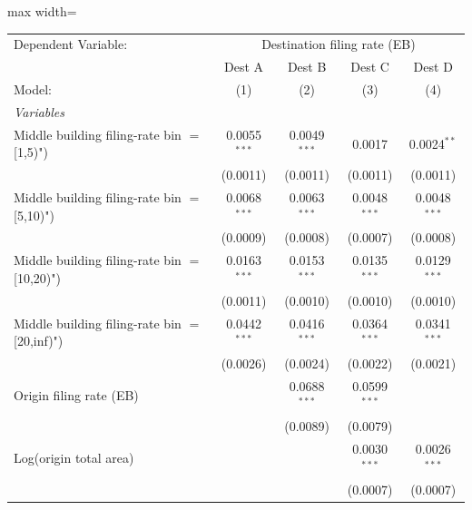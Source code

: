 \documentclass[
  11pt,
]{article}
\begin{document}
\begin{adjustbox}{max width=\textwidth}
\begingroup
\centering
\begin{tabular}{lcccc}
   \tabularnewline \midrule \midrule
   Dependent Variable: & \multicolumn{4}{c}{Destination filing rate (EB)}\\
                                                  & Dest A         & Dest B         & Dest C          & Dest D \\   
   Model:                                         & (1)            & (2)            & (3)             & (4)\\  
   \midrule
   \emph{Variables}\\
   Middle building filing-rate bin $=$ [1,5)")    & 0.0055$^{***}$ & 0.0049$^{***}$ & 0.0017          & 0.0024$^{**}$\\   
                                                  & (0.0011)       & (0.0011)       & (0.0011)        & (0.0011)\\   
   Middle building filing-rate bin $=$ [5,10)")   & 0.0068$^{***}$ & 0.0063$^{***}$ & 0.0048$^{***}$  & 0.0048$^{***}$\\   
                                                  & (0.0009)       & (0.0008)       & (0.0007)        & (0.0008)\\   
   Middle building filing-rate bin $=$ [10,20)")  & 0.0163$^{***}$ & 0.0153$^{***}$ & 0.0135$^{***}$  & 0.0129$^{***}$\\   
                                                  & (0.0011)       & (0.0010)       & (0.0010)        & (0.0010)\\   
   Middle building filing-rate bin $=$ [20,inf)") & 0.0442$^{***}$ & 0.0416$^{***}$ & 0.0364$^{***}$  & 0.0341$^{***}$\\   
                                                  & (0.0026)       & (0.0024)       & (0.0022)        & (0.0021)\\   
   Origin filing rate (EB)                        &                & 0.0688$^{***}$ & 0.0599$^{***}$  &   \\   
                                                  &                & (0.0089)       & (0.0079)        &   \\   
   Log(origin total area)                         &                &                & 0.0030$^{***}$  & 0.0026$^{***}$\\   
                                                  &                &                & (0.0007)        & (0.0007)\\   

\end{tabular}
\end{adjustbox}
\end{document}
